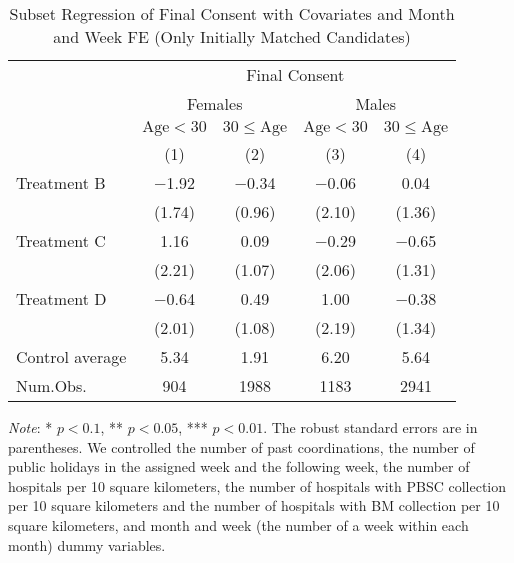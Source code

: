 \documentclass[12pt, a4paper]{article}
\begin{document}
\begin{table}[H]

\caption{\label{tab:lm-consent-subset2-init}Subset Regression of Final Consent with Covariates and Month and Week FE (Only Initially Matched Candidates)}
\centering
\fontsize{8}{10}\selectfont
\begin{threeparttable}
\begin{tabular}[t]{lcccc}
\toprule
\multicolumn{1}{c}{ } & \multicolumn{4}{c}{Final Consent} \\
\cmidrule(l{3pt}r{3pt}){2-5}
\multicolumn{1}{c}{ } & \multicolumn{2}{c}{Females} & \multicolumn{2}{c}{Males} \\
\cmidrule(l{3pt}r{3pt}){2-3} \cmidrule(l{3pt}r{3pt}){4-5}
\multicolumn{1}{c}{ } & \multicolumn{1}{c}{$\text{Age} < 30$} & \multicolumn{1}{c}{$30 \le \text{Age}$} & \multicolumn{1}{c}{$\text{Age} < 30$} & \multicolumn{1}{c}{$30 \le \text{Age}$} \\
\cmidrule(l{3pt}r{3pt}){2-2} \cmidrule(l{3pt}r{3pt}){3-3} \cmidrule(l{3pt}r{3pt}){4-4} \cmidrule(l{3pt}r{3pt}){5-5}
  & (1) & (2) & (3) & (4)\\
\midrule
Treatment B & \num{-1.92} & \num{-0.34} & \num{-0.06} & \num{0.04}\\
 & (\num{1.74}) & (\num{0.96}) & (\num{2.10}) & (\num{1.36})\\
Treatment C & \num{1.16} & \num{0.09} & \num{-0.29} & \num{-0.65}\\
 & (\num{2.21}) & (\num{1.07}) & (\num{2.06}) & (\num{1.31})\\
Treatment D & \num{-0.64} & \num{0.49} & \num{1.00} & \num{-0.38}\\
 & (\num{2.01}) & (\num{1.08}) & (\num{2.19}) & (\num{1.34})\\
\midrule
Control average & 5.34 & 1.91 & 6.20 & 5.64\\
Num.Obs. & \num{904} & \num{1988} & \num{1183} & \num{2941}\\
\bottomrule
\end{tabular}
\begin{tablenotes}
\item \emph{Note}: * $p < 0.1$, ** $p < 0.05$, *** $p < 0.01$. The robust standard errors are in parentheses. We controlled the number of past coordinations, the number of public holidays in the assigned week and the following week, the number of hospitals per 10 square kilometers, the number of hospitals with PBSC collection per 10 square kilometers and the number of hospitals with BM collection per 10 square kilometers, and month and week (the number of a week within each month) dummy variables.
\end{tablenotes}
\end{threeparttable}
\end{table}
\end{document}
